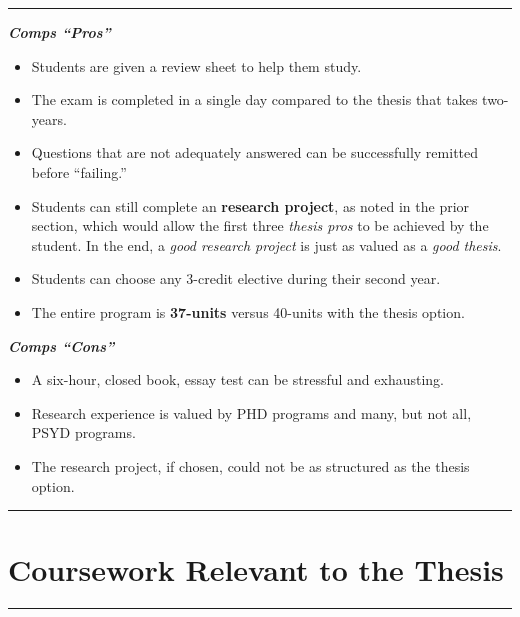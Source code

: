 \documentclass[
  openany]{book}
\providecommand{\tightlist}{%
  \setlength{\itemsep}{0pt}\setlength{\parskip}{0pt}}
\begin{document}
\begin{center}\rule{0.5\linewidth}{0.5pt}\end{center}

\textbf{\emph{Comps ``Pros''}}

\begin{itemize}
\tightlist
\item
  Students are given a review sheet to help them study.
\item
  The exam is completed in a single day compared to the thesis that takes two-years.
\item
  Questions that are not adequately answered can be successfully remitted before ``failing.''
\item
  Students can still complete an \textbf{research project}, as noted in the prior section, which would allow the first three \emph{thesis pros} to be achieved by the student. In the end, a \emph{good research project} is just as valued as a \emph{good thesis}.
\item
  Students can choose any 3-credit elective during their second year.
\item
  The entire program is \textbf{37-units} versus 40-units with the thesis option.
\end{itemize}

\textbf{\emph{Comps ``Cons''}}

\begin{itemize}
\tightlist
\item
  A six-hour, closed book, essay test can be stressful and exhausting.
\item
  Research experience is valued by PHD programs and many, but not all, PSYD programs.
\item
  The research project, if chosen, could not be as structured as the thesis option.
\end{itemize}

\begin{center}\rule{0.5\linewidth}{0.5pt}\end{center}

\hypertarget{coursework-relevant-to-the-thesis}{%
\chapter{Coursework Relevant to the Thesis}\label{coursework-relevant-to-the-thesis}}

\begin{center}\rule{0.5\linewidth}{0.5pt}\end{center}
\end{document}
